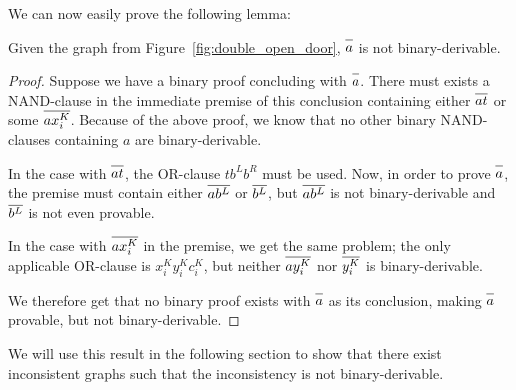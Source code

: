 We can now easily prove the following lemma:
\begin{lemma}
  Given the graph from Figure~\ref{fig:double_open_door}, $\ol{a}$ is not binary-derivable.
  \label{thm:a_not_binary_derivable}
\end{lemma}
\begin{proof}
Suppose we have a binary proof concluding with $\ol{a}$.
There must exists a NAND-clause in the immediate premise of this conclusion containing either $\ol{at}$ or some $\ol{ax^K_i}$.
Because of the above proof, we know that no other binary NAND-clauses containing $a$ are binary-derivable.

In the case with $\ol{at}$, the OR-clause $tb^Lb^R$ must be used.
Now, in order to prove $\ol{a}$, the premise must contain either $\ol{a b^L}$ or $\ol{b^L}$, but $\ol{a b^L}$ is not binary-derivable and $\ol{b^L}$ is not even provable.

In the case with $\ol{ax^K_i}$ in the premise, we get the same problem;
the only applicable OR-clause is $x^K_iy^K_ic^K_i$, but neither $\ol{a y^K_i}$ nor $\ol{y^K_i}$ is binary-derivable.

We therefore get that no binary proof exists with $\ol{a}$ as its conclusion, making $\ol{a}$ provable, but not binary-derivable.
\end{proof}
We will use this result in the following section to show that there exist inconsistent graphs such that the inconsistency is not binary-derivable.
